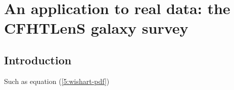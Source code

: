 
\chapter{An application to real data: the CFHTLenS galaxy survey}
\lhead[\fancyplain{}{\thepage}]{\fancyplain{}{\rightmark}}
 \thispagestyle{plain}
\setlength{\parindent}{10mm}


\section{Introduction}
Such as equation (\ref{5:wishart-pdf})

%